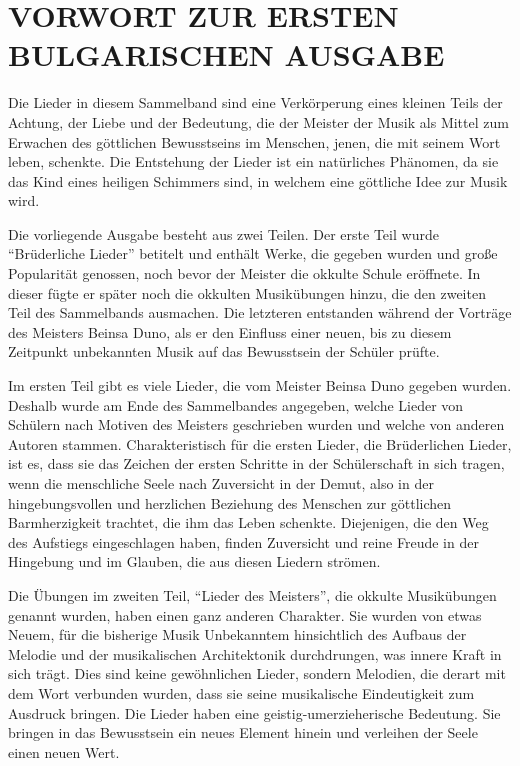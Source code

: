 \documentclass[11pt,a5paper,twoside]{article}
\begin{document}
\section[Vorwort zur ersten bulgarischen Ausgabe]{VORWORT ZUR ERSTEN BULGARISCHEN AUSGABE}

Die Lieder in diesem Sammelband sind eine Verkörperung eines kleinen Teils der Achtung, der Liebe und der Bedeutung, die der Meister der Musik als Mittel zum Erwachen des göttlichen Bewusstseins im Menschen, jenen, die mit seinem Wort leben, schenkte. Die Entstehung der Lieder ist ein natürliches Phänomen, da sie das Kind eines heiligen Schimmers sind, in welchem eine göttliche Idee zur Musik wird. 

Die vorliegende Ausgabe besteht aus zwei Teilen. Der erste Teil wurde "`Brüderliche Lieder"' betitelt und enthält Werke, die gegeben wurden und große Popularität genossen, noch bevor der Meister die okkulte Schule eröffnete. In dieser fügte er später noch die okkulten Musikübungen hinzu, die den zweiten Teil des Sammelbands ausmachen. Die letzteren entstanden während der Vorträge des Meisters Beinsa Duno, als er den Einfluss einer neuen, bis zu diesem Zeitpunkt unbekannten Musik auf das Bewusstsein der Schüler prüfte.

Im ersten Teil gibt es viele Lieder, die vom Meister Beinsa Duno gegeben wurden. Deshalb wurde am Ende des Sammelbandes angegeben, welche Lieder von Schülern nach Motiven des Meisters geschrieben wurden und welche von anderen Autoren stammen. Charakteristisch für die ersten Lieder, die Brüderlichen Lieder, ist es, dass sie das Zeichen der ersten Schritte in der Schülerschaft in sich tragen, wenn die menschliche Seele nach Zuversicht in der Demut, also in der hingebungsvollen und herzlichen Beziehung des Menschen zur göttlichen Barmherzigkeit trachtet, die ihm das Leben schenkte. Diejenigen, die den Weg des Aufstiegs eingeschlagen haben, finden Zuversicht und reine Freude in der Hingebung und im Glauben, die aus diesen Liedern strömen.

Die Übungen im zweiten Teil, "`Lieder des Meisters"', die okkulte Musikübungen genannt wurden, haben einen ganz anderen Charakter. Sie wurden von etwas Neuem, für die bisherige Musik Unbekanntem hinsichtlich des Aufbaus der Melodie und der musikalischen Architektonik durchdrungen, was innere Kraft in sich trägt. Dies sind keine gewöhnlichen Lieder, sondern Melodien, die derart mit dem Wort verbunden wurden, dass sie seine musikalische Eindeutigkeit zum Ausdruck bringen. Die Lieder haben eine geistig-umerzieherische Bedeutung. Sie bringen in das Bewusstsein ein neues Element hinein und verleihen der Seele einen neuen Wert.
\end{document}

